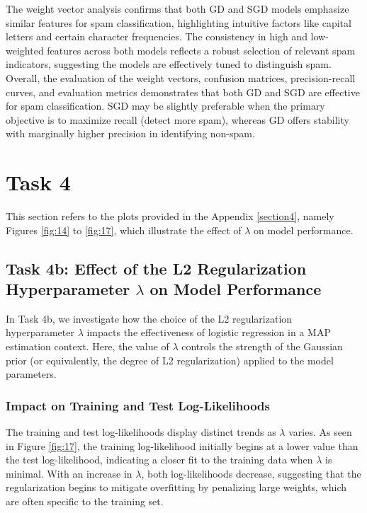 \documentclass[a4paper,oneside,bibliography=totoc]{scrartcl}
\begin{document}
The weight vector analysis confirms that both GD and SGD models emphasize similar features for spam classification, highlighting intuitive factors like capital letters and certain character frequencies. The consistency in high and low-weighted features across both models reflects a robust selection of relevant spam indicators, suggesting the models are effectively tuned to distinguish spam. Overall, the evaluation of the weight vectors, confusion matrices, precision-recall curves, and evaluation metrics demonstrates that both GD and SGD are effective for spam classification. SGD may be slightly preferable when the primary objective is to maximize recall (detect more spam), whereas GD offers stability with marginally higher precision in identifying non-spam.

\section{Task 4}
This section refers to the plots provided in the Appendix \ref{section4}, namely Figures \ref{fig:14} to \ref{fig:17}, which illustrate the effect of $\lambda$ on model performance.

\subsection{Task 4b: Effect of the L2 Regularization Hyperparameter $\lambda$ on Model Performance}

In Task 4b, we investigate how the choice of the L2 regularization hyperparameter $\lambda$ impacts the effectiveness of logistic regression in a MAP estimation context. Here, the value of $\lambda$ controls the strength of the Gaussian prior (or equivalently, the degree of L2 regularization) applied to the model parameters.

\subsubsection{Impact on Training and Test Log-Likelihoods}

The training and test log-likelihoods display distinct trends as $\lambda$ varies. As seen in Figure \ref{fig:17}, the training log-likelihood initially begins at a lower value than the test log-likelihood, indicating a closer fit to the training data when $\lambda$ is minimal. With an increase in $\lambda$, both log-likelihoods decrease, suggesting that the regularization begins to mitigate overfitting by penalizing large weights, which are often specific to the training set.
\end{document}
